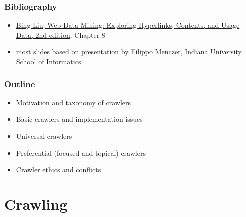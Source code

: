 \documentclass{beamer}
\subtitle{Web Crawling}
\begin{document}
\maketitle



\begin{frame} \frametitle{Bibliography}

    \begin{block}{}
        \begin{itemize}

       \item \href{http://www.cs.uic.edu/~liub/WebMiningBook.html}{Bing Liu, Web Data Mining: Exploring Hyperlinks, Contents, and
         Usage Data, 2nd edition}.  Chapter 8

       \item most slides based on presentation by Filippo Menczer, Indiana University School of Informatics
    
\end{itemize}
    \end{block}

\end{frame}


\begin{frame} \frametitle{Outline}

    \begin{itemize}

       \item  Motivation and taxonomy of crawlers
       \item  Basic crawlers and implementation issues
       \item  Universal crawlers
       \item  Preferential (focused and topical) crawlers
       \item  Crawler ethics and conflicts

\end{itemize}

\end{frame}


\section{Crawling}
\end{document}
